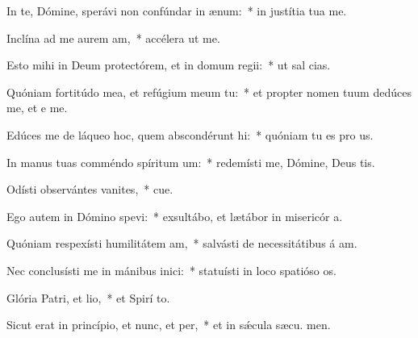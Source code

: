 \item In te, Dómine, sperávi non confúndar in ænum:~* in justítia tua  me.
\item Inclína ad me aurem am,~* accélera ut  me.
\item Esto mihi in Deum protectórem, et in domum regii:~* ut sal  cias.
\item Quóniam fortitúdo mea, et refúgium meum  tu:~* et propter nomen tuum dedúces me, et e me.
\item Edúces me de láqueo hoc, quem abscondérunt hi:~* quóniam tu es pro us.
\item In manus tuas comméndo spíritum um:~* redemísti me, Dómine, Deus tis.
\item Odísti observántes vanites,~* cue.
\item Ego autem in Dómino spevi:~* exsultábo, et lætábor in misericór a.
\item Quóniam respexísti humilitátem am,~* salvásti de necessitátibus á am.
\item Nec conclusísti me in mánibus inici:~* statuísti in loco spatióso  os.
\item Glória Patri, et lio,~* et Spirí to.
\item Sicut erat in princípio, et nunc, et per,~* et in sǽcula sæcu. men.
